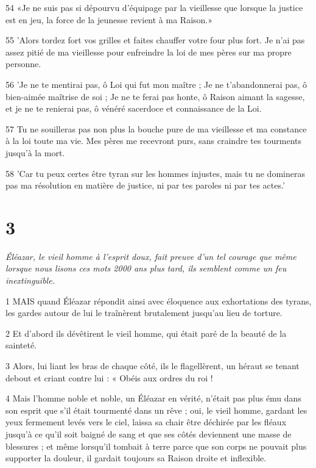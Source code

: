 \par 54 «Je ne suis pas si dépourvu d'équipage par la vieillesse que lorsque la justice est en jeu, la force de la jeunesse revient à ma Raison.»

\par 55 'Alors tordez fort vos grilles et faites chauffer votre four plus fort. Je n'ai pas assez pitié de ma vieillesse pour enfreindre la loi de mes pères sur ma propre personne.

\par 56 'Je ne te mentirai pas, ô Loi qui fut mon maître ; Je ne t'abandonnerai pas, ô bien-aimée maîtrise de soi ; Je ne te ferai pas honte, ô Raison aimant la sagesse, et je ne te renierai pas, ô vénéré sacerdoce et connaissance de la Loi.

\par 57 Tu ne souilleras pas non plus la bouche pure de ma vieillesse et ma constance à la loi toute ma vie. Mes pères me recevront purs, sans craindre tes tourments jusqu'à la mort.

\par 58 'Car tu peux certes être tyran sur les hommes injustes, mais tu ne domineras pas ma résolution en matière de justice, ni par tes paroles ni par tes actes.'

\chapter{3}

\par \textit{Éléazar, le vieil homme à l'esprit doux, fait preuve d'un tel courage que même lorsque nous lisons ces mots 2000 ans plus tard, ils semblent comme un feu inextinguible.}

\par 1 MAIS quand Éléazar répondit ainsi avec éloquence aux exhortations des tyrans, les gardes autour de lui le traînèrent brutalement jusqu'au lieu de torture.

\par 2 Et d'abord ils dévêtirent le vieil homme, qui était paré de la beauté de la sainteté.

\par 3 Alors, lui liant les bras de chaque côté, ils le flagellèrent, un héraut se tenant debout et criant contre lui : « Obéis aux ordres du roi !

\par 4 Mais l'homme noble et noble, un Éléazar en vérité, n'était pas plus ému dans son esprit que s'il était tourmenté dans un rêve ; oui, le vieil homme, gardant les yeux fermement levés vers le ciel, laissa sa chair être déchirée par les fléaux jusqu'à ce qu'il soit baigné de sang et que ses côtés deviennent une masse de blessures ; et même lorsqu'il tombait à terre parce que son corps ne pouvait plus supporter la douleur, il gardait toujours sa Raison droite et inflexible.

